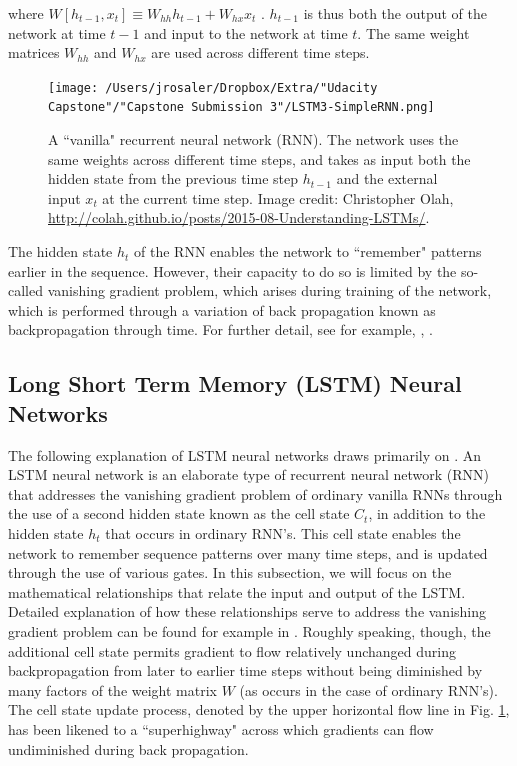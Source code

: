 \documentclass{article}
\begin{document}
\noindent where $W [h_{t-1}, x_{t}] \equiv W_{hh} h_{t-1} + W_{hx} x_{t}$ . $h_{t-1}$ is thus both the output of the network at time $t-1$ and input to the network at time $t$.  The same weight matrices $W_{hh}$ and  $W_{hx}$ are used across different time steps. 

\begin{figure}[]
\texttt{[image: /Users/jrosaler/Dropbox/Extra/"Udacity Capstone"/"Capstone Submission 3"/LSTM3-SimpleRNN.png]}
\caption{A ``vanilla" recurrent neural network (RNN). The network uses the same weights across different time steps, and takes as input both the hidden state from the previous time step $h_{t-1}$ and the external input $x_{t}$ at the current time step. Image credit: Christopher Olah, \url{http://colah.github.io/posts/2015-08-Understanding-LSTMs/}. }
\label{LSTMChain}
\end{figure}

The hidden state $h_{t}$ of the RNN enables the network to ``remember" patterns earlier in the sequence. However, their capacity to do so is limited by the so-called vanishing gradient problem, which arises during training of the network, which is performed through a variation of back propagation known as backpropagation through time. For further detail, see for example, \cite{olah2015understanding}, \cite{goodfellow2016deep}.





\subsection{Long Short Term Memory (LSTM) Neural Networks}

The following explanation of LSTM neural networks draws primarily on \cite{olah2015understanding}. An LSTM neural network is an elaborate type of recurrent neural network (RNN) that addresses the vanishing gradient problem of ordinary vanilla RNNs through the use of a second hidden state known as the cell state $C_{t}$, in addition to the hidden state $h_{t}$ that occurs in ordinary RNN's. This cell state enables the network to remember sequence patterns over many time steps, and is updated through the use of various gates. In this subsection, we will focus on the mathematical relationships that relate the input and output of the LSTM. Detailed explanation of how these relationships serve to address the vanishing gradient problem can be found for example in  \cite{goodfellow2016deep}. Roughly speaking, though, the additional cell state permits gradient to flow relatively unchanged during backpropagation from later to earlier time steps without being diminished by many factors of the weight matrix $W$ (as occurs in the case of ordinary RNN's). The cell state update process, denoted by the upper horizontal flow line in Fig. \ref{LSTMChain}, has been likened to a ``superhighway" across which gradients can flow undiminished during back propagation.  
\end{document}
